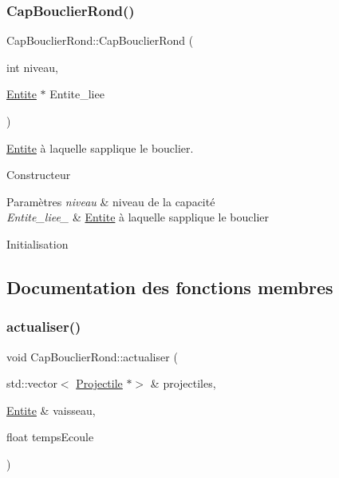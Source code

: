\subsubsection{\texorpdfstring{Cap\+Bouclier\+Rond()}{CapBouclierRond()}}
{\footnotesize\ttfamily Cap\+Bouclier\+Rond\+::\+Cap\+Bouclier\+Rond (\begin{DoxyParamCaption}\item[{int}]{niveau,  }\item[{\hyperlink{class_entite}{Entite} $\ast$}]{Entite\+\_\+liee }\end{DoxyParamCaption})}



\hyperlink{class_entite}{Entite} à laquelle s\textquotesingle{}applique le bouclier. 

Constructeur 
\begin{DoxyParams}{Paramètres}
{\em niveau} & niveau de la capacité \\
\hline
{\em Entite\+\_\+liee\+\_\+} & \hyperlink{class_entite}{Entite} à laquelle s\textquotesingle{}applique le bouclier\\
\hline
\end{DoxyParams}
Initialisation 

\subsection{Documentation des fonctions membres}
\mbox{\label{class_cap_bouclier_rond_a4b272fe8aece56cb0e0ba7bf21b9d574}} 
\subsubsection{\texorpdfstring{actualiser()}{actualiser()}}
{\footnotesize\ttfamily void Cap\+Bouclier\+Rond\+::actualiser (\begin{DoxyParamCaption}\item[{std\+::vector$<$ \hyperlink{class_projectile}{Projectile} $\ast$$>$ \&}]{projectiles,  }\item[{\hyperlink{class_entite}{Entite} \&}]{vaisseau,  }\item[{float}]{temps\+Ecoule }\end{DoxyParamCaption})\hspace{0.3cm}{\ttfamily [virtual]}}



